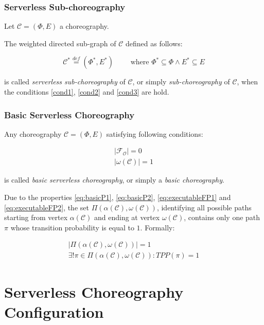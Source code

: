 \documentclass[12pt,a4paper]{report}
\newcommand{\mathDef}{\overset{\textit{def}}{=}}
\theoremstyle{definition}
\begin{document}
\subsubsection{Serverless Sub-choreography}

Let $\mathcal{C} = (\Phi,E)$ a choreography. 

The weighted directed sub-graph of $\mathcal{C}$ defined as follows:

\begin{equation}
	\mathcal{C}^* \mathDef (\Phi^*,E^*) \qquad \text{ where } \Phi^* \subseteq \Phi \wedge E^* \subseteq E
\end{equation}

is called \textit{serverless sub-choreography} of $\mathcal{C}$, or simply \textit{sub-choreography} of $\mathcal{C}$, when the conditions \ref{cond1}, \ref{cond2} and \ref{cond3} are hold.

\subsubsection{Basic Serverless Choreography}\label{BasicDefinition}

Any choreography $\mathcal{C} = (\Phi,E)$ satisfying following conditions:

\begin{eqnarray}
	|\mathscr{F_O}| = 0 \label{eq:basicP1} \\
	|\omega(\mathcal{C})| = 1 \label{eq:basicP2}
\end{eqnarray}

is called \textit{basic serverless choreography}, or simply a \textit{basic choreography}. 

Due to the properties \ref{eq:basicP1}, \ref{eq:basicP2}, \ref{eq:executableFP1} and \ref{eq:executableFP2}, the set $\Pi(\alpha(\mathcal{C}), \omega(\mathcal{C}))$, identifying all possible paths starting from vertex $\alpha(\mathcal{C})$ and ending at vertex $\omega(\mathcal{C})$, contains only one path $\pi$ whose transition probability is equal to $1$. Formally:

\begin{eqnarray}\label{eq:basicP3}
	|\Pi(\alpha(\mathcal{C}), \omega(\mathcal{C}))| = 1 \nonumber \\
	\exists! \pi \in \Pi(\alpha(\mathcal{C}), \omega(\mathcal{C})) : TPP(\pi) = 1
\end{eqnarray}


\section{Serverless Choreography Configuration}
\end{document}
